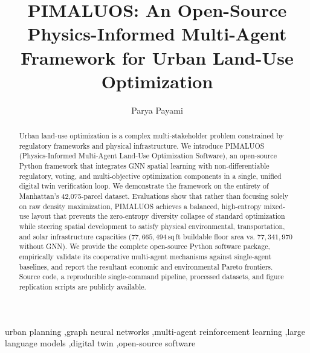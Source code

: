 \documentclass[final,3p,times]{elsarticle}
\begin{document}
\begin{frontmatter}

\title{PIMALUOS: An Open-Source Physics-Informed Multi-Agent Framework for Urban Land-Use Optimization}

\author[uwm]{Parya Payami}


\begin{abstract}
Urban land-use optimization is a complex multi-stakeholder problem constrained by regulatory frameworks and physical infrastructure. We introduce PIMALUOS (Physics-Informed Multi-Agent Land-Use Optimization Software), an open-source Python framework that integrates GNN spatial learning with non-differentiable regulatory, voting, and multi-objective optimization components in a single, unified digital twin verification loop. We demonstrate the framework on the entirety of Manhattan's 42,075-parcel dataset. Evaluations show that rather than focusing solely on raw density maximization, PIMALUOS achieves a balanced, high-entropy mixed-use layout that prevents the zero-entropy diversity collapse of standard optimization while steering spatial development to satisfy physical environmental, transportation, and solar infrastructure capacities ($77,665,494$\,sq\,ft buildable floor area vs. $77,341,970$ without GNN). We provide the complete open-source Python software package, empirically validate its cooperative multi-agent mechanisms against single-agent baselines, and report the resultant economic and environmental Pareto frontiers. Source code, a reproducible single-command pipeline, processed datasets, and figure replication scripts are publicly available.
\end{abstract}

\begin{keyword}
urban planning \sep graph neural networks \sep multi-agent reinforcement learning \sep large language models \sep digital twin \sep open-source software
\end{keyword}

\end{frontmatter}


\end{document}
